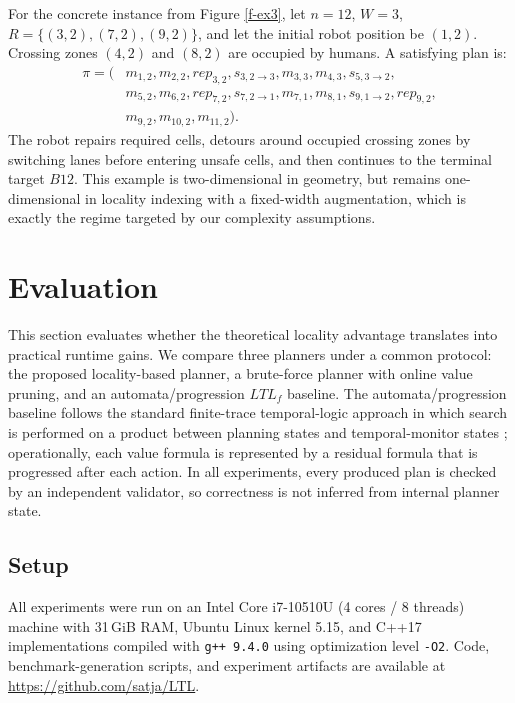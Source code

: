 \documentclass[]{jair}
\begin{document}
For the concrete instance from Figure \ref{f-ex3}, let $n=12$, $W=3$, $R=\{(3,2),(7,2),(9,2)\}$, and let the initial robot position be $(1,2)$.
Crossing zones $(4,2)$ and $(8,2)$ are occupied by humans.
A satisfying plan is:
\begin{equation*}
\begin{split}
\pi = (&m_{1,2}, m_{2,2}, rep_{3,2}, s_{3,2\to 3}, m_{3,3}, m_{4,3}, s_{5,3\to 2},\\
      &m_{5,2}, m_{6,2}, rep_{7,2}, s_{7,2\to 1}, m_{7,1}, m_{8,1}, s_{9,1\to 2}, rep_{9,2},\\
      &m_{9,2}, m_{10,2}, m_{11,2}).
\end{split}
\end{equation*}
The robot repairs required cells, detours around occupied crossing zones by switching lanes before entering unsafe cells, and then continues to the terminal target $B12$.
This example is two-dimensional in geometry, but remains one-dimensional in locality indexing with a fixed-width augmentation, which is exactly the regime targeted by our complexity assumptions.

\section{Evaluation}\label{eval}

This section evaluates whether the theoretical locality advantage translates into practical runtime gains. We compare three planners under a common protocol: the proposed locality-based planner, a brute-force planner with online value pruning, and an automata/progression $LTL_f$ baseline. The automata/progression baseline follows the standard finite-trace temporal-logic approach in which search is performed on a product between planning states and temporal-monitor states \cite{degiacomo2013ltlf,camacho2018finite}; operationally, each value formula is represented by a residual formula that is progressed after each action. In all experiments, every produced plan is checked by an independent validator, so correctness is not inferred from internal planner state.

\subsection{Setup}

All experiments were run on an Intel Core i7-10510U (4 cores / 8 threads) machine with 31\,GiB RAM, Ubuntu Linux kernel 5.15, and C++17 implementations compiled with \texttt{g++ 9.4.0} using optimization level \texttt{-O2}.
Code, benchmark-generation scripts, and experiment artifacts are available at \url{https://github.com/satja/LTL}.
\end{document}
